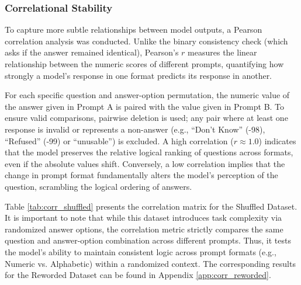 \subsubsection{Correlational Stability}
\label{results:corr_stability}
To capture more subtle relationships between model outputs, a Pearson correlation analysis was conducted. Unlike the binary consistency check (which asks if the answer remained identical), Pearson's $r$ measures the linear relationship between the numeric scores of different prompts, quantifying how strongly a model's response in one format predicts its response in another.

For each specific question and answer-option permutation, the numeric value of the answer given in Prompt A is paired with the value given in Prompt B. To ensure valid comparisons, pairwise deletion is used; any pair where at least one response is invalid or represents a non-answer (e.g., ``Don't Know'' (-98), ``Refused'' (-99) or ``unusable'') is excluded. A high correlation ($r \approx 1.0$) indicates that the model preserves the relative logical ranking of questions across formats, even if the absolute values shift. Conversely, a low correlation implies that the change in prompt format fundamentally alters the model's perception of the question, scrambling the logical ordering of answers.

Table \ref{tab:corr_shuffled} presents the correlation matrix for the Shuffled Dataset. It is important to note that while this dataset introduces task complexity via randomized answer options, the correlation metric strictly compares the same question and answer-option combination across different prompts. Thus, it tests the model's ability to maintain consistent logic across prompt formats (e.g., Numeric vs. Alphabetic) within a randomized context. The corresponding results for the Reworded Dataset can be found in Appendix \ref{app:corr_reworded}.

